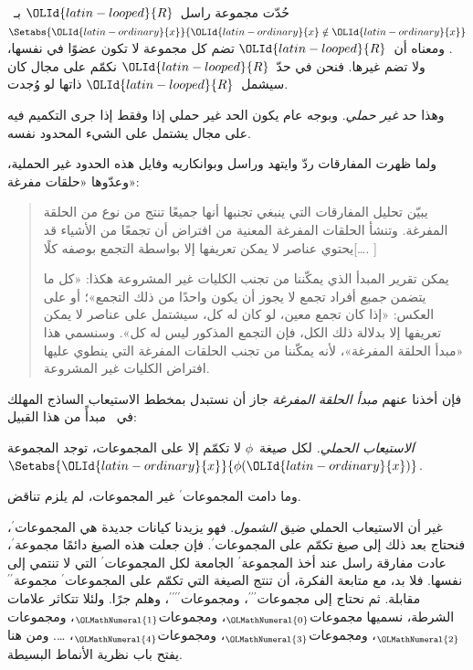 \documentclass[../../../include/open-logic-section]{subfiles}
\begin{document}


حُدّت مجموعة راسل~$\OLId{latin-looped}{R}$ بـ~$\Setabs{\OLId{latin-ordinary}{x}}{\OLId{latin-ordinary}{x} \notin \OLId{latin-ordinary}{x}}$. ومعناه أن~$\OLId{latin-looped}{R}$
تضم كل مجموعة لا تكون عضوًا في نفسها، ولا تضم غيرها. فنحن في حدّ~$\OLId{latin-looped}{R}$
نكمّم على مجال كان سيشمل~$\OLId{latin-looped}{R}$ ذاتها لو وُجدت.

وهذا حد \emph{غير حملي}. وبوجه عام يكون الحد غير حملي إذا وفقط إذا
جرى التكميم فيه على مجال يشتمل على الشيء المحدود نفسه.
	
ولما ظهرت المفارقات ردّ وايتهد وراسل وبوانكاريه وفايل هذه الحدود غير
الحملية، وعدّوها «حلقات مفرغة»:
\begin{quote}
	يبيّن تحليل المفارقات التي ينبغي تجنبها أنها جميعًا تنتج من نوع من
	الحلقة المفرغة. وتنشأ الحلقات المفرغة المعنية من افتراض أن تجمعًا من
	الأشياء قد يحتوي عناصر لا يمكن تعريفها إلا بواسطة التجمع بوصفه
	كلًا[\ldots. \textparagraph]

	يمكن تقرير المبدأ الذي يمكّننا من تجنب الكليات غير المشروعة هكذا:
	«كل ما يتضمن \emph{جميع} أفراد تجمع لا يجوز أن يكون واحدًا من ذلك
	التجمع»؛ أو على العكس: «إذا كان تجمع معين، لو كان له كل، سيشتمل على
	عناصر لا يمكن تعريفها إلا بدلالة ذلك الكل، فإن التجمع المذكور ليس له
	كل». وسنسمي هذا «مبدأ الحلقة المفرغة»، لأنه يمكّننا من تجنب الحلقات
	المفرغة التي ينطوي عليها افتراض الكليات غير المشروعة.
	\citep[p.~37]{WhiteheadRussell1910}
\end{quote}
فإن أخذنا عنهم \emph{مبدأ الحلقة المفرغة} جاز أن نستبدل بمخطط
الاستيعاب الساذج المهلك في~ مبدأً من
هذا القبيل:

\begin{defish}
\emph{الاستيعاب الحملي.} لكل صيغة~$\phi$ لا تكمّم إلا على المجموعات،
توجد المجموعة$^\prime$~$\Setabs{\OLId{latin-ordinary}{x}}{\phi(\OLId{latin-ordinary}{x})}$.
\end{defish}

وما دامت المجموعات$^{\prime}$ غير المجموعات، لم يلزم تناقض.

غير أن الاستيعاب الحملي ضيق \emph{الشمول}. فهو يزيدنا كيانات جديدة هي
المجموعات$^\prime$، فنحتاج بعد ذلك إلى صيغ تكمّم على
المجموعات$^\prime$. فإن جعلت هذه الصيغ دائمًا مجموعة$^\prime$، عادت
مفارقة راسل عند أخذ المجموعة$^\prime$ الجامعة لكل
المجموعات$^\prime$ التي لا تنتمي إلى نفسها. فلا بد، مع متابعة الفكرة،
أن تنتج الصيغة التي تكمّم على المجموعات$^\prime$
مجموعة$^{\prime\prime}$ مقابلة. ثم نحتاج إلى
مجموعات$^{\prime\prime\prime}$، ومجموعات$^{\prime\prime\prime\prime}$،
وهلم جرًا. ولئلا تتكاثر علامات الشرطة، نسميها مجموعات$_\OLMathNumeral{0}$،
ومجموعات$_\OLMathNumeral{1}$، ومجموعات$_\OLMathNumeral{2}$، ومجموعات$_\OLMathNumeral{3}$، ومجموعات$_\OLMathNumeral{4}$، \ldots.
ومن هنا يفتح باب نظرية الأنماط البسيطة.
\end{document}
